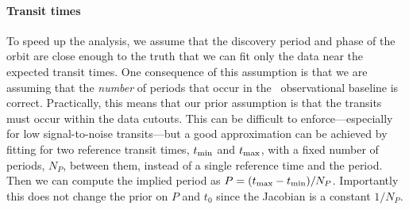 \documentclass[linenumbers,floatfix,ApJL,twocolumn]{aastex631}
\begin{document}
\paragraph{Transit times}
To speed up the analysis, we assume that the discovery period and phase of the orbit are close enough to the truth that we can fit only the data near the expected transit times.
One consequence of this assumption is that we are assuming that the \emph{number} of periods that occur in the \tess\ observational baseline is correct.
Practically, this means that our prior assumption is that the transits must occur within the data cutouts.
This can be difficult to enforce---especially for low signal-to-noise transits---but a good approximation can be achieved by fitting for two reference transit times, $t_{\rm min}$ and $t_{\rm max}$, with a fixed number of periods, $N_P$, between them, instead of a single reference time and the period.
Then we can compute the implied period as $P = (t_{\rm max} - t_{\rm min}) / N_P$.
Importantly this does not change the prior on $P$ and $t_0$ since the Jacobian is a constant $1/N_P$.
\end{document}

